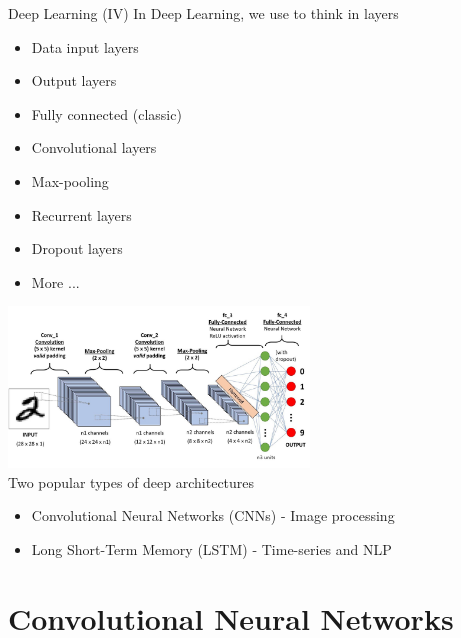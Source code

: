 \documentclass[10pt,compress]{beamer} %
\begin{document}
\begin{frame}{Deep Learning (IV)}
	In Deep Learning, we use to think in layers
	\begin{itemize}
		\item Data input layers
		\item Output layers
        	\item Fully connected (classic)
        	\item Convolutional layers
        	\item Max-pooling
        	\item Recurrent layers
        	\item Dropout layers
        	\item More ...
	\end{itemize}

    \vspace{-3.5cm}
	\hfill \includegraphics[width=0.6\textwidth]{figs/layers.png}\\

	Two popular types of deep architectures
	\begin{itemize}
		\item Convolutional Neural Networks (CNNs) - Image processing
		\item Long Short-Term Memory (LSTM) - Time-series and NLP 
	\end{itemize}
\end{frame}

\section{Convolutional Neural Networks}
\end{document}
